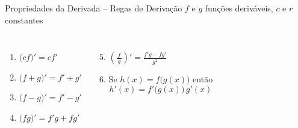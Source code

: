 \begin{frame}{Propriedades da Derivada -- Regas de Derivação}
  $f$ e $g$ funções deriváveis, $c$ e $r$ constantes
  \begin{columns}
    \begin{enumerate}[<+->]
      \item \( \big(cf \big)' = cf' \) \\[3mm]
      \item \( \big(f+g\big)' = f' + g' \)\\[3mm]
      \item \( \big(f-g\big)' = f' - g' \)\\[3mm]
      \item \( \big(fg \big)' = f'g + fg' \)
    \end{enumerate}
    \vspace{\baselineskip}
    \begin{enumerate}[<+->]
      \setcounter{enumi}{4}
      \item \( \left(\frac{f}{\,g\,}\right)' = \frac{f'g - fg'}{g^2} \)\\[7mm]
      \item Se \(h(x) = f\big(g(x)\big) \) então  \[ h'(x) = f'\big(g(x)\big)\,g'(x) \]
    \end{enumerate}
  \end{columns}
\end{frame}

\begin{frame}
  \tableofcontents
\end{frame}


